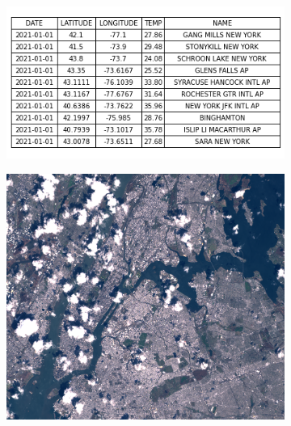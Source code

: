 \documentclass[../main.tex]{subfiles}
\begin{document}
\begin{figure}[H]
    \begin{subfigure}{.3\textwidth}
        \includegraphics[width=1\textwidth]{figures/intro/table.png}
        \caption{}
        \label{fig:intro:table}
    \end{subfigure}
    \begin{subfigure}{.3\textwidth}
        \includegraphics[width=1\textwidth]{figures/intro/landsat.png}
        \caption{}
        \label{fig:intro:image}
    \end{subfigure}
    \begin{subfigure}{.3\textwidth}

\end{subfigure}
\end{figure}
\end{document}
